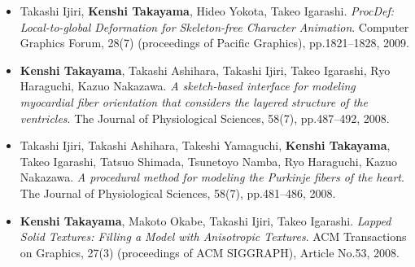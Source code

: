 \begin{itemize}
\item Takashi Ijiri, {\bf Kenshi Takayama}, Hideo Yokota, Takeo Igarashi. {\it ProcDef: Local-to-global Deformation for Skeleton-free Character Animation}. Computer Graphics Forum, 28(7) (proceedings of Pacific Graphics), pp.1821--1828, 2009.
\item {\bf Kenshi Takayama}, Takashi Ashihara, Takashi Ijiri, Takeo Igarashi, Ryo Haraguchi, Kazuo Nakazawa. {\it A sketch-based interface for modeling myocardial fiber orientation that considers the layered structure of the ventricles}. The Journal of Physiological Sciences, 58(7), pp.487--492, 2008.
\item Takashi Ijiri, Takashi Ashihara, Takeshi Yamaguchi, {\bf Kenshi Takayama}, Takeo Igarashi, Tatsuo Shimada, Tsunetoyo Namba, Ryo Haraguchi, Kazuo Nakazawa. {\it A procedural method for modeling the Purkinje fibers of the heart}. The Journal of Physiological Sciences, 58(7), pp.481--486, 2008.
\item {\bf Kenshi Takayama}, Makoto Okabe, Takashi Ijiri, Takeo Igarashi. {\it Lapped Solid Textures: Filling a Model with Anisotropic Textures}. ACM Transactions on Graphics, 27(3) (proceedings of ACM SIGGRAPH), Article No.53, 2008.
\end{itemize}
